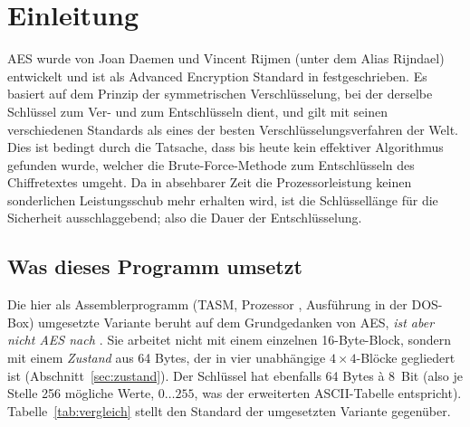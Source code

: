\section{Einleitung}\label{sec:einleitung}
AES wurde von Joan Daemen und Vincent Rijmen (unter dem Alias Rijndael) entwickelt und ist als Advanced Encryption Standard in \cite{fips197} festgeschrieben. Es basiert auf dem Prinzip der symmetrischen Verschlüsselung, bei der derselbe Schlüssel zum Ver- und zum Entschlüsseln dient, und gilt mit seinen verschiedenen Standards als eines der besten Verschlüsselungsverfahren der Welt. Dies ist bedingt durch die Tatsache, dass bis heute kein effektiver Algorithmus gefunden wurde, welcher die Brute-Force-Methode zum Entschlüsseln des Chiffretextes umgeht. Da in absehbarer Zeit die Prozessorleistung keinen sonderlichen Leistungsschub mehr erhalten wird, ist die Schlüssellänge für die Sicherheit ausschlaggebend; also die Dauer der Entschlüsselung.

\subsection{Was dieses Programm umsetzt}
Die hier als Assemblerprogramm (TASM, Prozessor , Ausführung in der DOS-Box) umgesetzte Variante beruht auf dem Grundgedanken von AES, \emph{ist aber nicht AES nach \cite{fips197}}. Sie arbeitet nicht mit einem einzelnen 16-Byte-Block, sondern mit einem \emph{Zustand} aus 64 Bytes, der in vier unabhängige $4\times4$-Blöcke gegliedert ist (Abschnitt~\ref{sec:zustand}). Der Schlüssel hat ebenfalls 64 Bytes à 8~Bit (also je Stelle 256 mögliche Werte, $0\ldots255$, was der erweiterten ASCII-Tabelle entspricht). Tabelle~\ref{tab:vergleich} stellt den Standard der umgesetzten Variante gegenüber.

